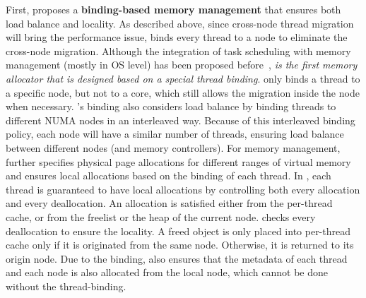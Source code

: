 First, \NM{} proposes a \textbf{binding-based memory management} that ensures both load balance and locality. As described above, since cross-node thread migration will bring the performance issue, \NM{} binds every thread to a node to eliminate the cross-node migration. Although the integration of task scheduling with memory management (mostly in OS level) has been proposed before~\cite{Redline, wagle2015numa, diener2015automatic}, \textit{\NM{} is the first memory allocator that is designed based on a special thread binding}. \NM{} only binds a thread to a specific node, but not to a core, which still allows the migration inside the node when necessary. \NM{}'s binding also considers load balance by binding threads to different NUMA nodes in an interleaved way. 
Because of this interleaved binding policy, each node will have a similar number of threads, ensuring load balance between different nodes (and memory controllers). For memory management, \NM{} further specifies physical page allocations for different ranges of virtual memory and ensures local allocations based on the binding of each thread. In \NM{}, each thread is guaranteed to have local allocations by controlling both every allocation and every deallocation. An allocation is satisfied either from the per-thread cache, or from the freelist or the heap of the current node. \NM{} checks every deallocation to ensure the locality. A freed object is only placed into per-thread cache only if it is originated from the same node. Otherwise, it is returned to its origin node. Due to the binding, \NM{} also ensures that the metadata of each thread and each node is also allocated from the local node, which cannot be done without the thread-binding.



  
